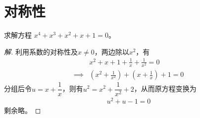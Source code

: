 \chapter{对称性}
\label{chap:symetric}

\begin{example}
  求解方程 $x^4+x^3+x^2+x+1=0$。
\end{example}
\begin{proof}[解]
  利用系数的对称性及$x\ne 0$，两边除以$x^2$，有
  \begin{align*}
    &x^2+x+1+\frac1x+\frac1{x^2}=0\\
    \implies& \left(x^2+\frac1{x^2}\right) + \left(x+\frac1x\right) + 1 = 0
  \end{align*}
  分组后令$u=x+\dfrac1x$，则有$u^2=x^2+\dfrac1{x^2}+2$，从而原方程变换为
  \begin{align*}
    u^2 + u - 1 = 0
  \end{align*}
  剩余略。
\end{proof}
